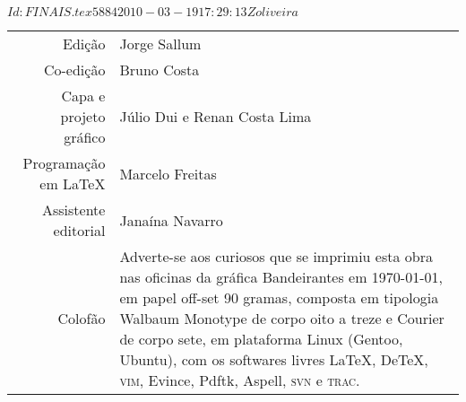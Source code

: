 \SVN $Id: FINAIS.tex 5884 2010-03-19 17:29:13Z oliveira $


\newcommand{\putline}[2]{#1 & #2\\}


\pagebreak

\noindent\begin{tabular}{rp{}}
\small
\putline{Edição}{Jorge Sallum}
		\putline{Co-edição}{Bruno Costa}
		\putline{Capa e projeto gráfico}{Júlio Dui e Renan Costa Lima}
		\putline{Programação em LaTeX}{Marcelo Freitas}
		\putline{Assistente editorial}{Janaína Navarro}
		\putline{Colofão}{Adverte-se aos curiosos que se
			imprimiu esta obra nas oficinas da gráfica
			Bandeirantes em \today, em papel 
			\mbox{off-set} 90 gramas,
			composta em tipologia Walbaum Monotype de 
			corpo oito a treze e Courier de corpo sete, 
			em plataforma Linux (Gentoo, Ubuntu), 
			com os softwares livres 
			\LaTeX, De\TeX, \textsc{vim}, Evince, Pdftk, 
			Aspell, \textsc{svn} e \textsc{trac}.}
\end{tabular}

